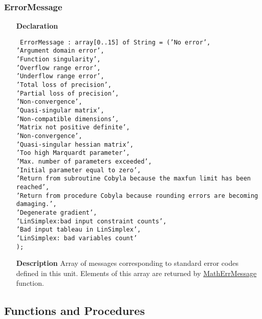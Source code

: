 \documentclass[12pt,a4paper,oneside]{report}
\newcommand{\lmath}[1]{   %
	\marginpar{\vspace{#1} 
		\begin{flushright}
			LMath
	\end{flushright} }
}
\newcommand{\declarationitem}[1]{\textbf{#1}}
\newcommand{\descriptiontitle}[1]{\textbf{#1}}
\newcommand{\code}[1]{\texttt{#1}}
\begin{document}
\subsubsection{ErrorMessage}
\lmath{-24pt}
\label{uErrors-ErrorMessage}
\begin{itemize}\item[\declarationitem{Declaration}\hfill]
	\begin{flushleft}
		\code{
			ErrorMessage : array[0..15] of String =
			('No error',\\
			'Argument domain error',\\
			'Function singularity',\\
			'Overflow range error',\\
			'Underflow range error',\\
			'Total loss of precision',\\
			'Partial loss of precision',\\
			'Non-convergence',\\
			'Quasi-singular matrix',\\
			'Non-compatible dimensions',\\
			'Matrix not positive definite',\\
			'Non-convergence',\\
			'Quasi-singular hessian matrix',\\
			'Too high Marquardt parameter',\\
			'Max. number of parameters exceeded',\\
			'Initial parameter equal to zero',\\
     		'Return from subroutine Cobyla because the maxfun limit has been reached',\\
			'Return from procedure Cobyla because rounding errors are becoming damaging.',\\
			'Degenerate gradient',\\
			'LinSimplex:bad input constraint counts',\\
			'Bad input tableau in LinSimplex',\\
			'LinSimplex: bad variables count'\\
			);}
	\end{flushleft}
\item[\descriptiontitle{Description}] Array of messages corresponding to standard error codes defined in this unit. Elements of this array are returned by \hyperref[uErrors-MathErrMessage]{MathErrMessage} function.	
\end{itemize}
\subsection{Functions and Procedures}
\end{document}

